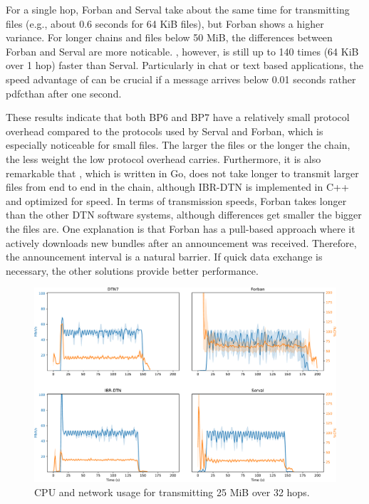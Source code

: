 For a single hop, Forban and Serval take about the same time for transmitting files (e.g., about 0.6 seconds for 64 KiB files), but Forban shows a higher variance.
For longer chains and files below 50 MiB, the differences between Forban and Serval are more noticable.
\dtn, however, is still up to 140 times (64 KiB over 1 hop) faster than Serval. %
Particularly in chat or text based applications, the speed advantage of \dtn can be crucial if a message arrives below 0.01 seconds rather pdfcthan after one second.

These results indicate that both BP6 and BP7 have a relatively small protocol overhead compared to the protocols used by Serval and Forban, which is especially noticeable for small files.
The larger the files or the longer the chain, the less weight the low protocol overhead carries.
Furthermore, it is also remarkable that \dtn, which is written in Go, does not take longer to transmit larger files from end to end in the chain, although IBR-DTN is implemented in C++ and optimized for speed.
In terms of transmission speeds, Forban takes longer than the other DTN software systems, although differences get smaller the bigger the files are. One explanation is that Forban has a pull-based approach where it actively downloads new bundles after an announcement was received. Therefore, the announcement interval is a natural barrier. If quick data exchange is necessary, the other solutions provide better performance.

\begin{figure}[t]
    \includegraphics[width=\columnwidth]{figs/cpu_network-crop.pdf}
    \caption{CPU and network usage for transmitting 25 MiB over 32 hops.}
    \label{penning2019dtn7:fig:cpu_net}
\end{figure}


